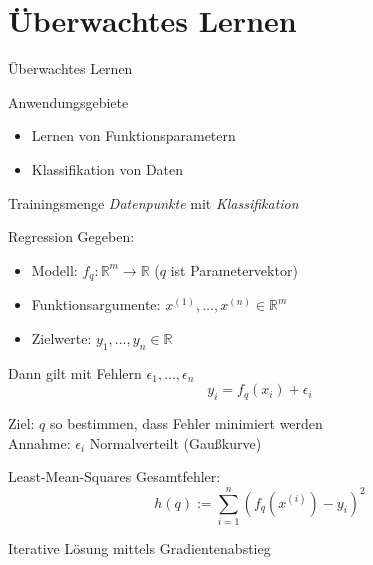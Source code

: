 \documentclass[xcolor={dvipsnames,svgnames},draft]{beamer}
\begin{document}
\section{Überwachtes Lernen}

\begin{frame}{Überwachtes Lernen}

  \begin{exampleblock}{Anwendungsgebiete}
    \begin{itemize}
    \item Lernen von Funktionsparametern
    \item Klassifikation von Daten
    \end{itemize}
  \end{exampleblock}

  \begin{block}{Trainingsmenge}
    \textit{Datenpunkte} mit \textit{Klassifikation}
  \end{block}

\end{frame}

\begin{frame}{Regression}
  Gegeben:
  \begin{itemize}
  \item Modell: $f_q : \mathbb{R}^m \to \mathbb{R} $ ($q$ ist Parametervektor)
  \item Funktionsargumente: $x^{(1)},\ldots,x^{(n)} \in \mathbb{R}^m$ \\
  \item Zielwerte: $y_1,\ldots, y_n \in \mathbb{R}$ \\
  \end{itemize}
  \vspace{1em}

  \pause

  Dann gilt mit Fehlern $\epsilon_1,\ldots,\epsilon_n$
  \[
    y_i = f_q(x_i) + \epsilon_i
  \]

  \pause

  Ziel: $q$ so bestimmen, dass Fehler minimiert werden \\
  Annahme: $\epsilon_i$ Normalverteilt (Gaußkurve)
\end{frame}

\begin{frame}{Least-Mean-Squares}
  Gesamtfehler:
  \[
    h(q) := \sum_{i=1}^n (f_q(x^{(i)}) - y_i)^2
  \]

  Iterative Lösung mittels Gradientenabstieg
\end{frame}
\end{document}
